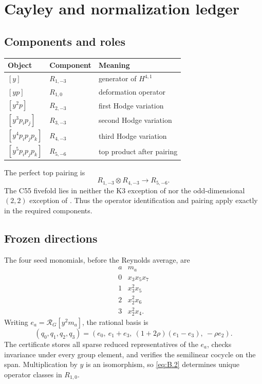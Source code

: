 \section{Cayley and normalization ledger}
\label{app:cayley}

\subsection{Components and roles}

\begin{center}
\small
\begin{tabular}{@{}lll@{}}
\toprule
Object & Component & Meaning\\
\midrule
\([y]\) & \(R_{1,-3}\) & generator of \(H^{4,1}\)\\
\([yp]\) & \(R_{1,0}\) & deformation operator\\
\([y^2p]\) & \(R_{2,-3}\) & first Hodge variation\\
\([y^3p_ip_j]\) & \(R_{3,-3}\) & second Hodge variation\\
\([y^4p_ip_jp_k]\) & \(R_{4,-3}\) & third Hodge variation\\
\([y^5p_ip_jp_k]\) & \(R_{5,-6}\) & top product after pairing\\
\bottomrule
\end{tabular}
\end{center}

The perfect top pairing is
\[
 R_{1,-3}\otimes R_{4,-3}\longrightarrow R_{5,-6}.
\]
The C55 fivefold lies in neither the K3 exception of
\cite[Theorem 6.1(2)]{Konno1991} nor the odd-dimensional \((2,2)\)
exception of \cite[Theorem 6.1(4)]{Konno1991}.  Thus the operator
identification and pairing apply exactly in the required components.

\subsection{Frozen directions}

The four seed monomials, before the Reynolds average, are
\[
\begin{array}{c|c}
a&m_a\\ \hline
0&x_3x_5x_7\\
1&x_3^2x_5\\
2&x_2^2x_6\\
3&x_2^2x_4.
\end{array}                                         \tag{B.1}
\]
Writing \(e_a=\mathcal R_G[y^2m_a]\), the rational basis is
\[
 (q_0,q_1,q_2,q_3)
 =(e_0,\ e_1+e_3,\ (1+2\rho)(e_1-e_3),\ -\rho e_2).
 \tag{B.2}
\label{eq:B.2}
\]
The certificate stores all sparse reduced representatives of the \(e_a\),
checks invariance under every group element, and verifies the semilinear
cocycle on the span.  Multiplication by \(y\) is an isomorphism, so
\cref{eq:B.2} determines unique operator classes in \(R_{1,0}\).


